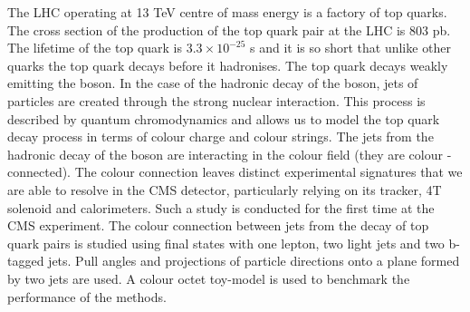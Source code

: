 The LHC operating at 13 TeV centre of mass energy is a factory of top quarks. The cross section of the production of the top quark pair at the LHC is 803 pb. The lifetime of the top quark is $3.3\times10^{-25}$ s and it is so short that unlike other quarks the top quark decays before it hadronises. The top quark decays weakly emitting the \PW boson. In the case of the hadronic decay of the \PW boson, jets of particles are created through the strong nuclear interaction. This process is described by quantum chromodynamics and allows us to model the top quark decay process in terms of colour charge and colour strings. The jets from the hadronic decay of the \PW boson are interacting in the colour field (they are colour - connected). The colour connection leaves distinct experimental signatures that we are able to resolve in the CMS detector, particularly relying on its tracker, 4T solenoid and calorimeters. Such a study is conducted for the first time at the CMS experiment. The colour connection between jets from the decay of top quark pairs is studied using final states with one lepton, two light jets and two b-tagged jets. Pull angles and projections of particle directions onto a plane formed by two jets are used. A colour octet \PW toy-model is used to benchmark the performance of the methods.
